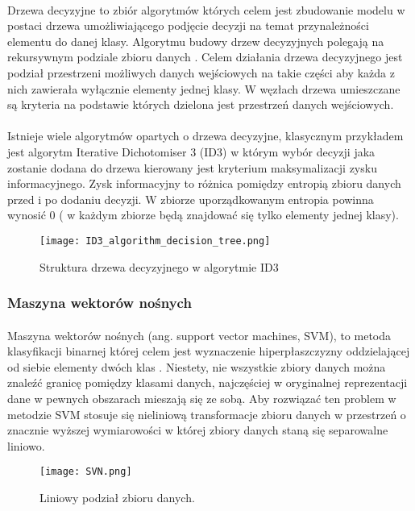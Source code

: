\documentclass[a4paper,12pt,twoside]{article}
\begin{document}
\paragraph{}
Drzewa decyzyjne to zbiór algorytmów których celem jest zbudowanie modelu w postaci drzewa umożliwiającego podjęcie decyzji na temat przynależności elementu do danej klasy. Algorytmu budowy drzew decyzyjnych polegają na rekursywnym podziale zbioru danych \cite{tree}. Celem działania drzewa decyzyjnego jest podział przestrzeni możliwych danych wejściowych na takie części aby każda z nich zawierała wyłącznie elementy jednej klasy. W węzłach drzewa umieszczane są kryteria na podstawie których dzielona jest przestrzeń danych wejściowych. 
\paragraph{}
Istnieje wiele algorytmów opartych o drzewa decyzyjne, klasycznym przykładem jest algorytm Iterative Dichotomiser 3 (ID3) w którym wybór decyzji jaka zostanie dodana do drzewa kierowany jest kryterium maksymalizacji zysku informacyjnego. Zysk informacyjny to różnica pomiędzy entropią zbioru danych przed i po dodaniu decyzji. W zbiorze uporządkowanym entropia powinna wynosić 0 ( w każdym zbiorze będą znajdować się tylko elementy jednej klasy).
\begin{figure}[h]
    \centering
    \texttt{[image: ID3\_algorithm\_decision\_tree.png]}
    \caption{Struktura drzewa decyzyjnego w algorytmie ID3}
\end{figure}


\subsubsection{Maszyna wektorów nośnych}
\paragraph{}
Maszyna wektorów nośnych (ang. support vector machines, SVM), to metoda klasyfikacji binarnej której celem jest wyznaczenie hiperpłaszczyzny oddzielającej od siebie elementy dwóch klas \cite{svm}. Niestety, nie wszystkie zbiory danych można znaleźć granicę pomiędzy klasami danych, najczęściej w oryginalnej reprezentacji dane w pewnych obszarach mieszają się ze sobą. Aby rozwiązać ten problem w metodzie SVM stosuje się nieliniową transformacje zbioru danych w przestrzeń o znacznie wyższej wymiarowości w której zbiory danych staną się separowalne liniowo. 
\begin{figure}[h]
    \centering
    \texttt{[image: SVN.png]}
    \caption{Liniowy podział zbioru danych.}
\end{figure}
\end{document}
